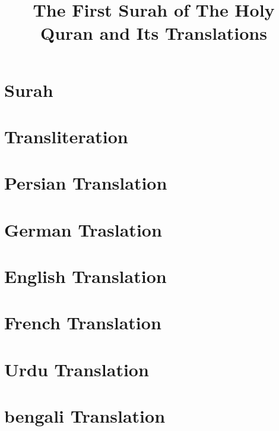 \documentclass{article}
\title{The First Surah of The Holy Quran and Its Translations}
\author{}\date{}
\begin{document}
\parindent=0pt
\maketitle

\thispagestyle{empty}

\begin{multicols}{2}

    \section*{Surah \surahname[1]}
    \begin{arab}[utf]
        \qurantext
    \end{arab}
    
    \section*{Transliteration}
    \qurantextlt

    \section{Persian Translation}
    \begin{arab}[utf]
        \qurantextfa
    \end{arab}


    \section{German Traslation}
    \qurantextde

    \section{English Translation}
    \qurantexten

    \section{French Translation}
    \qurantextfr

    \section{Urdu Translation}
    \begin{arab}[utf]
        \qurantextur
    \end{arab}

    \section{bengali Translation}
    {\bengali\qurantextbn}

\end{multicols}
\end{document}
